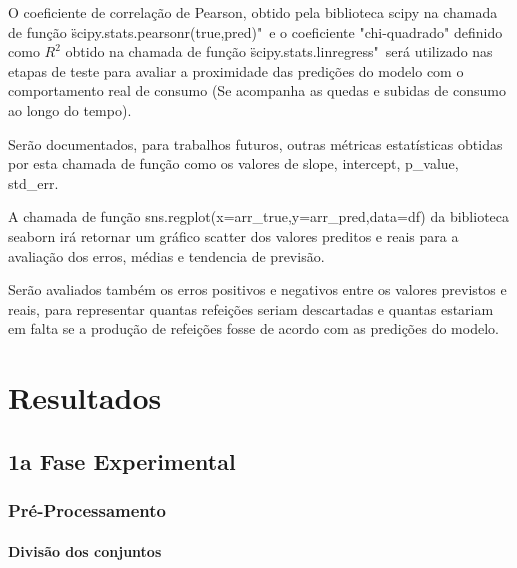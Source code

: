 \documentclass[	12pt, Times, openright, twoside, a4paper, english, brazil]{abntex2}
\begin{document}
        O coeficiente de correlação de Pearson, obtido pela biblioteca scipy na chamada de função \"scipy.stats.pearsonr(true,pred)"\ e o coeficiente "chi-quadrado" definido como $R^2$ obtido na chamada de função \"scipy.stats.linregress"\ será utilizado nas etapas de teste para avaliar a proximidade das predições do modelo com o comportamento real de consumo (Se acompanha as quedas e subidas de consumo ao longo do tempo).\newline
       
        Serão documentados, para trabalhos futuros, outras métricas estatísticas obtidas por esta chamada de função como os valores de slope, intercept, p\_value, std\_err.\newline
       
        A chamada de função sns.regplot(x=arr\_true,y=arr\_pred,data=df) da biblioteca seaborn irá retornar um gráfico scatter dos valores preditos e reais para a avaliação dos erros, médias e tendencia de previsão.\newline 
       
       Serão avaliados também os erros positivos e negativos entre os valores previstos e reais, para representar quantas refeições seriam descartadas e quantas estariam em falta se a produção de refeições fosse de acordo com as predições do modelo.
       
  \chapter{Resultados}
	\section{1a Fase Experimental}
	    \subsection{Pré-Processamento}
    	    \subsubsection{Divisão dos conjuntos}
\end{document}
